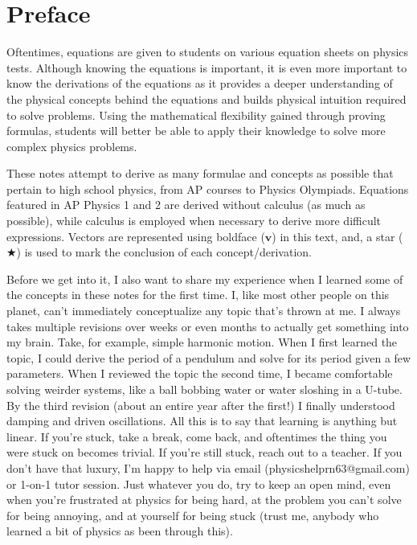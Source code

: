 \chapter*{Preface}

\qquad Oftentimes, equations are given to students on various equation sheets on physics tests. Although knowing the equations is important, it is even more important to know the derivations of the equations as it provides a deeper understanding of the physical concepts behind the equations and builds physical intuition required to solve problems. Using the mathematical flexibility gained through proving formulas, students will better be able to apply their knowledge to solve more complex physics problems.
\par These notes attempt to derive as many formulae and concepts as possible that pertain to high school physics, from AP courses to Physics Olympiads. Equations featured in AP Physics 1 and 2 are derived without calculus (as much as possible), while calculus is employed when necessary to derive more difficult expressions. Vectors are represented using boldface ($\textbf{v}$) in this text, and, a star ($\bigstar$) is used to mark the conclusion of each concept/derivation.
\par Before we get into it, I also want to share my experience when I learned some of the concepts in these notes for the first time. I, like most other people on this planet, can't immediately conceptualize any topic that's thrown at me. I always takes multiple revisions over weeks or even months to actually get something into my brain. Take, for example, simple harmonic motion. When I first learned the topic, I could derive the period of a pendulum and solve for its period given a few parameters. When I reviewed the topic the second time, I became comfortable solving weirder systems, like a ball bobbing water or water sloshing in a U-tube. By the third revision (about an entire year after the first!) I finally understood damping and driven oscillations. All this is to say that learning is anything but linear. If you're stuck, take a break, come back, and oftentimes the thing you were stuck on becomes trivial. If you're still stuck, reach out to a teacher. If you don't have that luxury, I'm happy to help via email (physicshelprn63@gmail.com) or 1-on-1 tutor session. Just whatever you do, try to keep an open mind, even when you're frustrated at physics for being hard, at the problem you can't solve for being annoying, and at yourself for being stuck (trust me, anybody who learned a bit of physics as been through this).
